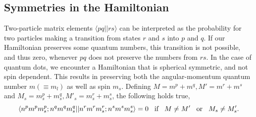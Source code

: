 \subsection{Symmetries in the Hamiltonian}
Two-particle matrix elements $\langle pq||rs \rangle$ can be interpreted as the probability for two particles making a transition from states $r$ and $s$ into $p$ and $q$.
If our Hamiltonian preserves some quantum numbers, this transition is not possible, and thus zero, whenever $pq$ does not preserve the numbers from $rs$.
In the case of quantum dots, we encounter a Hamiltonian that is spherical symmetric, and not spin dependent.
This results in preserving both the angular-momentum quantum number $m (\equiv m_l)$ as well as spin $m_s$.
Defining $M =m^p + m^q, M' = m^r + m^s$ and $M_s = m_s^p + m_s^q, M'_s = m_s^r + m_s^s$, the following holds true,
\begin{equation}
\langle n^p m^p m_s^p; n^q m^q m_s^q || n^r m^r m_s^r; n^s m^s m_s^s \rangle
= 
0
\hspace{3mm}\textrm{if}\hspace{3mm}
M \neq M'
\hspace{3mm}\textrm{or}\hspace{3mm}
M_s \neq M'_s .
\end{equation}

